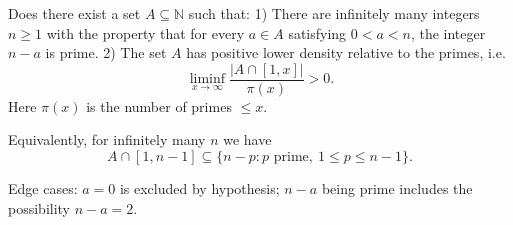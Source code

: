 Does there exist a set $A\subseteq\mathbb N$ such that:
1) There are infinitely many integers $n\ge 1$ with the property that for every $a\in A$ satisfying $0<a<n$, the integer $n-a$ is prime.
2) The set $A$ has positive lower density relative to the primes, i.e.
\[
\liminf_{x\to\infty}\frac{|A\cap[1,x]|}{\pi(x)}>0.
\]
Here $\pi(x)$ is the number of primes $\le x$.

Equivalently, for infinitely many $n$ we have
\[
A\cap[1,n-1]\subseteq \{n-p: p\text{ prime},\ 1\le p\le n-1\}.
\]

Edge cases: $a=0$ is excluded by hypothesis; $n-a$ being prime includes the possibility $n-a=2$.
